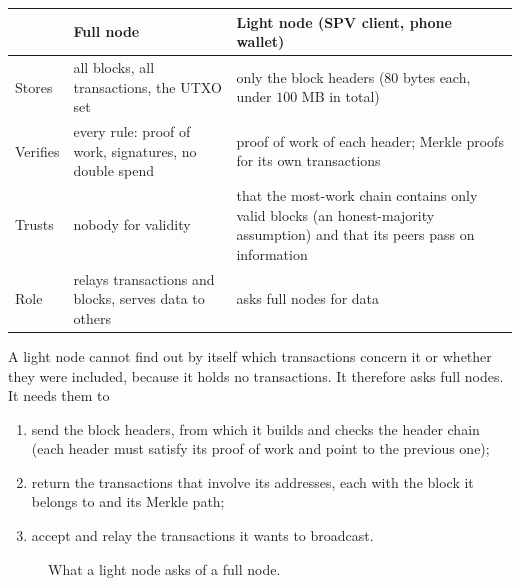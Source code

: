 \documentclass[11pt,a4paper]{article}
\theoremstyle{definition}
\theoremstyle{plain}
\theoremstyle{remark}
\begin{document}
\begin{center}
\footnotesize\renewcommand{\arraystretch}{0.95}
\begin{tabular}{@{}p{2.2cm}p{6.6cm}p{6.6cm}@{}}
\toprule
 & \textbf{Full node} & \textbf{Light node (SPV client, phone wallet)}\\
\midrule
Stores & all blocks, all transactions, the UTXO set & only the block headers ($80$ bytes each, under $100$ MB in total)\\
Verifies & every rule: proof of work, signatures, no double spend & proof of work of each header; Merkle proofs for its own transactions\\
Trusts & nobody for validity & that the most-work chain contains only valid blocks (an honest-majority assumption) and that its peers pass on information\\
Role & relays transactions and blocks, serves data to others & asks full nodes for data\\
\bottomrule
\end{tabular}
\end{center}

A light node cannot find out by itself which transactions concern it or whether they were included, because it holds no transactions. It therefore asks full nodes. It needs them to
\begin{enumerate}[nosep,leftmargin=1.5em]
\item send the block headers, from which it builds and checks the header chain (each header must satisfy its proof of work and point to the previous one);
\item return the transactions that involve its addresses, each with the block it belongs to and its Merkle path;
\item accept and relay the transactions it wants to broadcast.
\end{enumerate}

\begin{figure}[htbp]
\centering
{}
\caption{What a light node asks of a full node.}
\end{figure}
\end{document}
